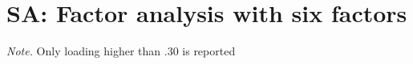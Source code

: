 \begin{appendix}
\begin{center}
\begin{ThreePartTable}
\end{ThreePartTable}
\end{center}

\hypertarget{sa-factor-analysis-with-six-factors}{%
\section{SA: Factor analysis with six
factors}\label{sa-factor-analysis-with-six-factors}}

\begin{center}
\begin{ThreePartTable}

\begin{TableNotes}[para]
\normalsize{\textit{Note.} Only loading higher than .30 is reported}
\end{TableNotes}


\end{ThreePartTable}
\end{center}
\end{appendix}
